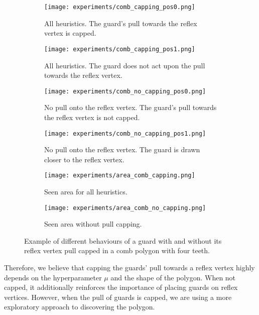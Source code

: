\begin{figure}[h!]
    \centering
    \begin{subfigure}{0.45\textwidth}
        \texttt{[image: experiments/comb\_capping\_pos0.png]}
        \caption{All heuristics. The guard's pull towards the reflex vertex is capped.}
        \label{fig:all_cap_pos0}
    \end{subfigure}
    \hfill
    \begin{subfigure}{0.45\textwidth}
        \texttt{[image: experiments/comb\_capping\_pos1.png]}
        \caption{All heuristics. The guard does not act upon the pull towards the reflex vertex.}
        \label{fig:all_cap_pos1}
    \end{subfigure}
    \vfill
    \begin{subfigure}{0.45\textwidth}
        \texttt{[image: experiments/comb\_no\_capping\_pos0.png]}
        \caption{No pull onto the reflex vertex. The guard's pull towards the reflex vertex is not capped.}
        \label{fig:no_cap_pos0}
    \end{subfigure}
    \hfill
    \begin{subfigure}{0.45\textwidth}
        \texttt{[image: experiments/comb\_no\_capping\_pos1.png]}
        \caption{No pull onto the reflex vertex. The guard is drawn closer to the reflex vertex.}
        \label{fig:no_cap_pos1}
    \end{subfigure}
    \vfill
    \begin{subfigure}{0.45\textwidth}
        \texttt{[image: experiments/area\_comb\_capping.png]}
        \caption{Seen area for all heuristics.}
        \label{fig:area_all_cap}
    \end{subfigure}
    \hfill
    \begin{subfigure}{0.45\textwidth}
        \texttt{[image: experiments/area\_comb\_no\_capping.png]}
        \caption{Seen area without pull capping.}
        \label{fig:area_no_cap}
    \end{subfigure}
    \caption{Example of different behaviours of a guard with and without its reflex vertex pull capped in a comb polygon with four teeth.}
    \label{fig:no_capping}
\end{figure}

Therefore, we believe that capping the guards' pull towards a reflex vertex highly depends on the hyperparameter $\mu$ and the shape of the polygon. When not capped, it additionally reinforces the importance of placing guards on reflex vertices. However, when the pull of guards is capped, we are using a more exploratory approach to discovering the polygon.

